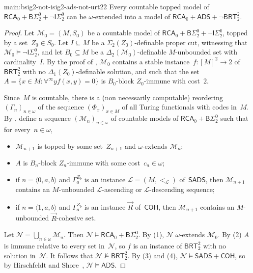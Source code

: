 \documentclass{article}
\def\L{\mathcal{L}}
\def\M{\mathcal{M}}
\def\Nc{\mathcal{N}}
\newcommand{\ISig}{\mathsf{I}\Sigma^0}
\newcommand{\BSig}{\mathsf{B}\Sigma^0}
\newcommand{\RCA}[0]{\mathsf{RCA}}
\newcommand{\ADS}[0]{\mathsf{ADS}}
\newcommand{\SADS}[0]{\mathsf{SADS}}
\newcommand{\COH}[0]{\mathsf{COH}}
\newcommand{\BRT}[0]{\mathsf{BRT}}
\numberwithin{theorem}{section}
\begin{document}
\begin{repmaintheorem}{main:bsig2-not-isig2-ads-not-urt22}
Every countable topped model of $\RCA_0 + \BSig_2 + \neg \ISig_2$ can be $\omega$-extended into a model of $\RCA_0 + \ADS + \neg \BRT^2_2$.    
\end{repmaintheorem}
\begin{proof}
Let $\M_0 = (M, S_0)$ be a countable model of $\RCA_0 + \BSig_2 + \neg \ISig_2$, topped by a set~$Z_0 \in S_0$. Let $I \subseteq M$ be a $\Sigma_2(Z_0)$-definable proper cut, witnessing that $\M_0 \models \neg \ISig_2$, and let $B_0 \subseteq M$ be a $\Delta_2(\M_0)$-definable $M$-unbounded set with cardinality~$I$.
By the proof of , $\M_0$ contains a stable instance~$f : [M]^2 \to 2$ of $\BRT^2_2$ with no $\Delta_1(Z_0)$-definable solution, and such that the set $A = \{ x \in M : \forall^\infty y f(x, y) = 0 \}$ is $B_0$-block $Z_0$-immune with cost~2.

Since~$M$ is countable, there is a (non necessarily computable) reordering $(\Gamma_n)_{n \in \omega}$ of the sequence $(\Phi_x)_{x \in M}$ of all Turing functionals with codes in~$M$.
By , define a sequence $(\M_n)_{n \in \omega}$ of countable models of $\RCA_0 + \BSig_2$ such that for every~$n \in \omega$,
\begin{itemize}
    \item[(1)] $\M_{n+1}$ is topped by some set~$Z_{n+1}$ and $\omega$-extends $\M_n$;
    \item[(2)] $A$ is $B_n$-block $Z_n$-immune with some cost~$c_n \in \omega$;
    \item[(3)] if $n = \langle 0, a, b\rangle$ 
    and $\Gamma_a^{Z_b}$ is an instance $\L = (M, <_\L)$ of~$\SADS$, then $\M_{n+1}$ contains an $M$-unbounded $\L$-ascending or $\L$-descending sequence;
    \item[(4)] if $n = \langle 1, a, b\rangle$ and $\Gamma_a^{Z_b}$ is an instance $\vec{R}$ of~$\COH$, then $\M_{n+1}$ contains an $M$-unbounded $\vec{R}$-cohesive set.
\end{itemize}
Let $\Nc = \bigcup_{n \in \omega} \M_n$. Then $\Nc \models \RCA_0 + \BSig_2$.
By (1), $\Nc$ $\omega$-extends $\M_0$. By (2) $A$ is immune relative to every set in~$\Nc$, so $f$ is an instance of $\BRT^2_2$ with no solution in~$\Nc$. It follows that $\Nc \not \models \BRT^2_2$.
By (3) and (4), $\Nc \models \SADS + \COH$, so by Hirschfeldt and Shore~\cite{hirschfeldt_combinatorial_2007}, $\Nc \models \ADS$.
\end{proof}
\end{document}
